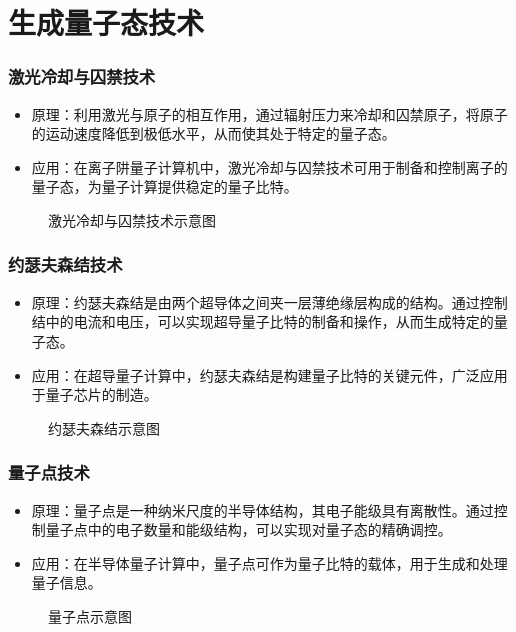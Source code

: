 \section{生成量子态技术}
\begin{frame}
    \frametitle{激光冷却与囚禁技术}
    \begin{itemize}
        \item 原理：利用激光与原子的相互作用，通过辐射压力来冷却和囚禁原子，将原子的运动速度降低到极低水平，从而使其处于特定的量子态。
        \item 应用：在离子阱量子计算机中，激光冷却与囚禁技术可用于制备和控制离子的量子态，为量子计算提供稳定的量子比特。
    \end{itemize}
    \begin{figure}
        \centering
        \caption{激光冷却与囚禁技术示意图}
    \end{figure}
\end{frame}

\begin{frame}
    \frametitle{约瑟夫森结技术}
    \begin{itemize}
        \item 原理：约瑟夫森结是由两个超导体之间夹一层薄绝缘层构成的结构。通过控制结中的电流和电压，可以实现超导量子比特的制备和操作，从而生成特定的量子态。
        \item 应用：在超导量子计算中，约瑟夫森结是构建量子比特的关键元件，广泛应用于量子芯片的制造。
    \end{itemize}
    \begin{figure}
        \centering
        \caption{约瑟夫森结示意图}
    \end{figure}
\end{frame}

\begin{frame}
    \frametitle{量子点技术}
    \begin{itemize}
        \item 原理：量子点是一种纳米尺度的半导体结构，其电子能级具有离散性。通过控制量子点中的电子数量和能级结构，可以实现对量子态的精确调控。
        \item 应用：在半导体量子计算中，量子点可作为量子比特的载体，用于生成和处理量子信息。
    \end{itemize}
    \begin{figure}
        \centering
        \caption{量子点示意图}
    \end{figure}
\end{frame}

